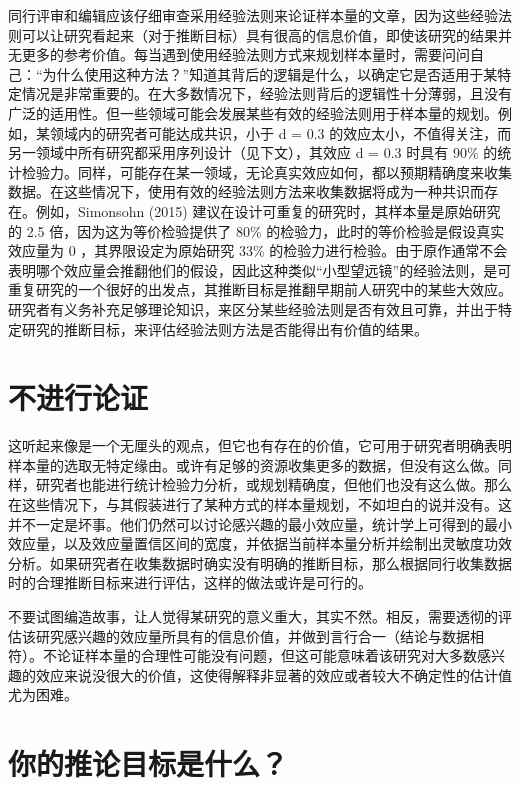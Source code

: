 \documentclass[
  letterpaper,
  DIV=11,
  numbers=noendperiod]{scrreprt}
\begin{document}
同行评审和编辑应该仔细审查采用经验法则来论证样本量的文章，因为这些经验法则可以让研究看起来（对于推断目标）具有很高的信息价值，即使该研究的结果并无更多的参考价值。每当遇到使用经验法则方式来规划样本量时，需要问问自己：``为什么使用这种方法？''知道其背后的逻辑是什么，以确定它是否适用于某特定情况是非常重要的。在大多数情况下，经验法则背后的逻辑性十分薄弱，且没有广泛的适用性。但一些领域可能会发展某些有效的经验法则用于样本量的规划。例如，某领域内的研究者可能达成共识，小于
d = 0.3
的效应太小，不值得关注，而另一领域中所有研究都采用序列设计（见下文），其效应
d = 0.3 时具有 90\%
的统计检验力。同样，可能存在某一领域，无论真实效应如何，都以预期精确度来收集数据。在这些情况下，使用有效的经验法则方法来收集数据将成为一种共识而存在。例如，Simonsohn
(2015) 建议在设计可重复的研究时，其样本量是原始研究的 2.5
倍，因为这为等价检验提供了 80\%
的检验力，此时的等价检验是假设真实效应量为 0 ，其界限设定为原始研究 33\%
的检验力进行检验。由于原作通常不会表明哪个效应量会推翻他们的假设，因此这种类似``小型望远镜''的经验法则，是可重复研究的一个很好的出发点，其推断目标是推翻早期前人研究中的某些大效应。研究者有义务补充足够理论知识，来区分某些经验法则是否有效且可靠，并出于特定研究的推断目标，来评估经验法则方法是否能得出有价值的结果。

\hypertarget{ux4e0dux8fdbux884cux8bbaux8bc1}{%
\section{不进行论证}\label{ux4e0dux8fdbux884cux8bbaux8bc1}}

这听起来像是一个无厘头的观点，但它也有存在的价值，它可用于研究者明确表明样本量的选取无特定缘由。或许有足够的资源收集更多的数据，但没有这么做。同样，研究者也能进行统计检验力分析，或规划精确度，但他们也没有这么做。那么在这些情况下，与其假装进行了某种方式的样本量规划，不如坦白的说并没有。这并不一定是坏事。他们仍然可以讨论感兴趣的最小效应量，统计学上可得到的最小效应量，以及效应量置信区间的宽度，并依据当前样本量分析并绘制出灵敏度功效分析。如果研究者在收集数据时确实没有明确的推断目标，那么根据同行收集数据时的合理推断目标来进行评估，这样的做法或许是可行的。

不要试图编造故事，让人觉得某研究的意义重大，其实不然。相反，需要透彻的评估该研究感兴趣的效应量所具有的信息价值，并做到言行合一（结论与数据相符）。不论证样本量的合理性可能没有问题，但这可能意味着该研究对大多数感兴趣的效应来说没很大的价值，这使得解释非显著的效应或者较大不确定性的估计值尤为困难。

\hypertarget{ux4f60ux7684ux63a8ux8bbaux76eeux6807ux662fux4ec0ux4e48}{%
\section{你的推论目标是什么？}\label{ux4f60ux7684ux63a8ux8bbaux76eeux6807ux662fux4ec0ux4e48}}
\end{document}
